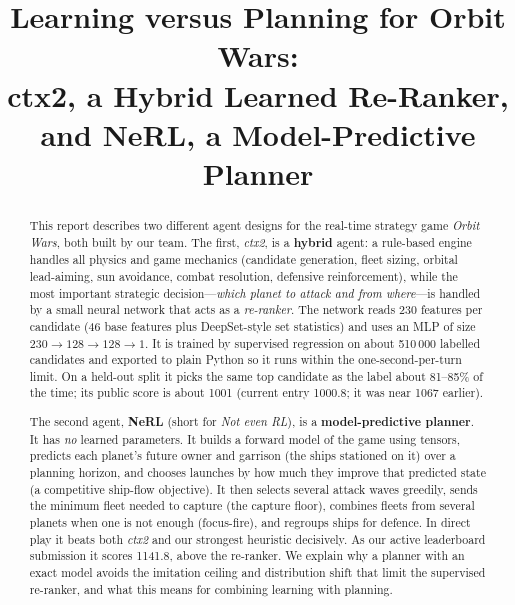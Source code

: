 \documentclass[conference]{IEEEtran}
\begin{document}
\title{Learning versus Planning for Orbit Wars:\\
ctx2, a Hybrid Learned Re-Ranker, and NeRL, a Model-Predictive Planner}

\author{

}

\maketitle

\begin{abstract}
This report describes two different agent designs for the real-time strategy game \textit{Orbit Wars}, both built by our team. The first, \textit{ctx2}, is a \textbf{hybrid} agent: a rule-based engine handles all physics and game mechanics (candidate generation, fleet sizing, orbital lead-aiming, sun avoidance, combat resolution, defensive reinforcement), while the most important strategic decision---\textit{which planet to attack and from where}---is handled by a small neural network that acts as a \textit{re-ranker}. The network reads 230 features per candidate (46 base features plus DeepSet-style set statistics) and uses an MLP of size $230 \rightarrow 128 \rightarrow 128 \rightarrow 1$. It is trained by supervised regression on about 510\,000 labelled candidates and exported to plain Python so it runs within the one-second-per-turn limit. On a held-out split it picks the same top candidate as the label about 81--85\% of the time; its public score is about 1001 (current entry 1000.8; it was near 1067 earlier).

The second agent, \textbf{NeRL} (short for \emph{Not even RL}), is a \textbf{model-predictive planner}. It has \emph{no} learned parameters. It builds a forward model of the game using tensors, predicts each planet's future owner and garrison (the ships stationed on it) over a planning horizon, and chooses launches by how much they improve that predicted state (a competitive ship-flow objective). It then selects several attack waves greedily, sends the minimum fleet needed to capture (the capture floor), combines fleets from several planets when one is not enough (focus-fire), and regroups ships for defence. In direct play it beats both \textit{ctx2} and our strongest heuristic decisively. As our active leaderboard submission it scores 1141.8, above the re-ranker. We explain why a planner with an exact model avoids the imitation ceiling and distribution shift that limit the supervised re-ranker, and what this means for combining learning with planning.
\end{abstract}
\end{document}
